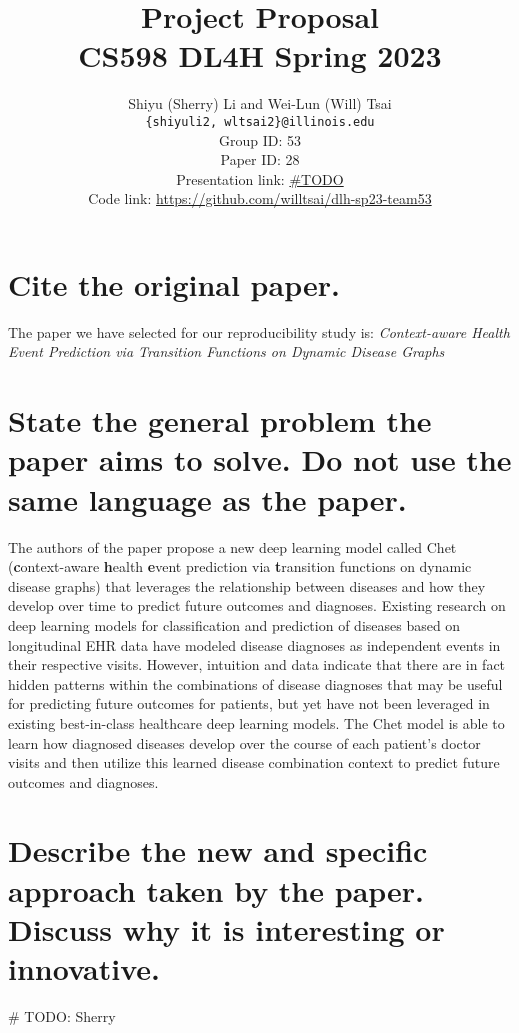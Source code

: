 \documentclass[11pt,a4paper]{article}
\title{
  Project Proposal \\
  CS598 DL4H Spring 2023
  }
\author{Shiyu (Sherry) Li and Wei-Lun (Will) Tsai \\
  \texttt{\{shiyuli2, wltsai2\}@illinois.edu}
  \\[2em]
  Group ID: 53\\
  Paper ID: 28\\
  Presentation link: \url{\#TODO} \\
  Code link: \url{https://github.com/willtsai/dlh-sp23-team53}}
\begin{document}
\maketitle


\section{Cite the original paper.}
The paper we have selected for our reproducibility study is: 
\textit{Context-aware Health Event Prediction via Transition 
Functions on Dynamic Disease Graphs} \cite{chet}

\section{State the general problem the paper aims to solve. Do not
use the same language as the paper.}
The authors of the paper propose a new deep learning model called Chet
(\textbf{c}ontext-aware \textbf{h}ealth \textbf{e}vent prediction via
\textbf{t}ransition functions on dynamic disease graphs) that leverages the
relationship between diseases and how they develop over time to predict future
outcomes and diagnoses. Existing research on deep learning models for
classification and prediction of diseases based on longitudinal EHR data have
modeled disease diagnoses as independent events in their respective visits.
However, intuition and data indicate that there are in fact hidden patterns
within the combinations of disease diagnoses that may be useful for predicting
future outcomes for patients, but yet have not been leveraged in existing
best-in-class healthcare deep learning models. The Chet model is able to learn
how diagnosed diseases develop over the course of each patient's doctor visits
and then utilize this learned disease combination context to predict future
outcomes and diagnoses. 

\section{Describe the new and specific approach taken by the
paper. Discuss why it is interesting or innovative.}
\# TODO: Sherry
\end{document}
